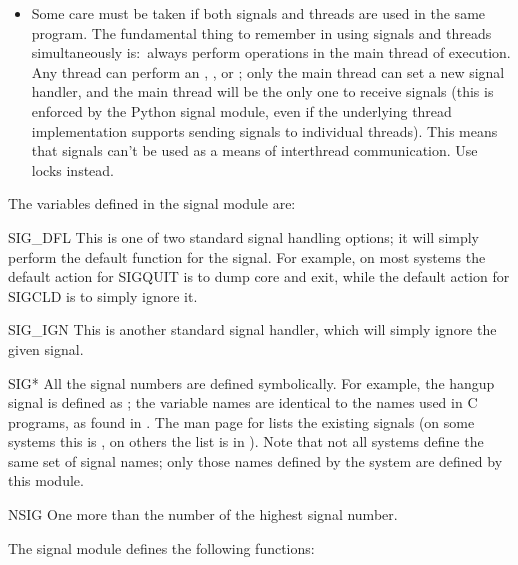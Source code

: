 \begin{itemize}
\item
Some care must be taken if both signals and threads are used in the
same program.  The fundamental thing to remember in using signals and
threads simultaneously is:\ always perform  operations
in the main thread of execution.  Any thread can perform an
, , or ; only the main
thread can set a new signal handler, and the main thread will be the
only one to receive signals (this is enforced by the Python signal
module, even if the underlying thread implementation supports sending
signals to individual threads).  This means that signals can't be used
as a means of interthread communication.  Use locks instead.

\end{itemize}

The variables defined in the signal module are:

\renewcommand{\indexsubitem}{(in module signal)}
\begin{datadesc}{SIG_DFL}
  This is one of two standard signal handling options; it will simply
  perform the default function for the signal.  For example, on most
  systems the default action for SIGQUIT is to dump core and exit,
  while the default action for SIGCLD is to simply ignore it.
\end{datadesc}

\begin{datadesc}{SIG_IGN}
  This is another standard signal handler, which will simply ignore
  the given signal.
\end{datadesc}

\begin{datadesc}{SIG*}
  All the signal numbers are defined symbolically.  For example, the
  hangup signal is defined as ; the variable names
  are identical to the names used in C programs, as found in
  .
  The \UNIX{} man page for  lists the existing signals (on
  some systems this is , on others the list is in
  ).
  Note that not all systems define the same set of signal names; only
  those names defined by the system are defined by this module.
\end{datadesc}

\begin{datadesc}{NSIG}
  One more than the number of the highest signal number.
\end{datadesc}

The signal module defines the following functions:

